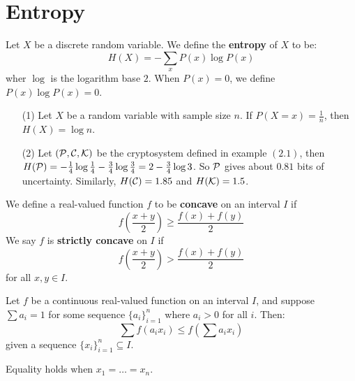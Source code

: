 
\section{Entropy}
\label{section1}

\begin{definition}
    Let $X$ be a discrete random variable. We define the  \textbf{entropy} of
    $X$ to be:
    \begin{equation}
        H(X)=-\sum_{x}{P(x)\log{P(x)}}
    \end{equation}
    wher $\log$ is the logarithm base  $2$. When  $P(x)=0$, we define
    $P(x)\log{P(x)}=0$.
\end{definition}

\begin{example}
    \begin{enumerate}
        \item[(1)] Let $X$ be a random variable with sample size  $n$. If
            $P(X=x)=\frac{1}{n}$, then $H(X)=\log{n}$.

        \item[(2)] Let $(\mathcal{P}, \mathcal{C}, \mathcal{K})$ be the cryptosystem defined in example
            $(2.1)$, then
            $H(\mathcal{P})=-\frac{1}{4}\log{\frac{1}{4}}-\frac{3}{4}\log{\frac{3}{4}}=
            2-\frac{3}{4}\log{3}$. So $\mathcal{P}$ gives about  $0.81$ bits of
            uncertainty. Similarly,  $H(\mathcal{C})=1.85$ and $H(\mathcal{K})=1.5$.
    \end{enumerate}
\end{example}

\begin{definition}
    We define a real-valued function $f$ to be  \textbf{concave} on an interval
    $I$ if
    \begin{equation}
        f(\frac{x+y}{2}) \geq \frac{f(x)+f(y)}{2}
    \end{equation}
    We say $f$ is  \textbf{strictly concave} on $I$ if
    \begin{equation}
        f(\frac{x+y}{2}) > \frac{f(x)+f(y)}{2}
    \end{equation}
    for all  $x,y \in I$.
\end{definition}

\begin{theorem}\label{2.2.1}
    Let $f$ be a continuous real-valued function on an interval $I$, and
    suppose  $\sum{a_i}=1$ for some sequence $\{a_i\}_{i=1}^n$ where $a_i>0$ for
    all  $i$. Then:
    \begin{equation}
        \sum{f(a_ix_i)} \leq f(\sum{a_ix_i})
    \end{equation}
    given a sequence $\{x_i\}_{i=1}^n \subseteq I$.
\end{theorem}
\begin{corollary}
    Equality holds when $x_1=\dots=x_n$.
\end{corollary}

